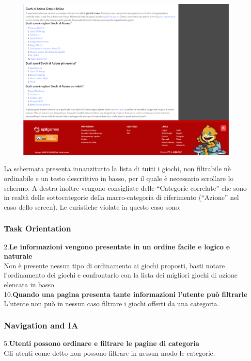 \documentclass[../Report.tex]{subfiles}
\begin{document}
    \begin{figure}[H]
        \includegraphics[width=\linewidth]{Assestment8.png}
        \centering
    \end{figure}
    La schermata presenta innanzitutto la lista di tutti i giochi, non filtrabile nè ordinabile e un testo descrittivo in basso, per il quale è necessario scrollare lo schermo. A destra inoltre vengono consigliate delle “Categorie correlate” che sono in realtà delle sottocategorie della macro-categoria di riferimento (“Azione” nel caso dello screen). Le euristiche violate in questo caso sono:

    \subsubsection{Task Orientation}
    2.\textbf{Le informazioni vengono presentate in un ordine facile e logico e naturale}\\
        Non è presente nessun tipo di ordinamento ai giochi proposti, basti notare l’ordinamento dei giochi e confrontarlo con la lista dei migliori giochi di azione elencata in basso.\\

    10.\textbf{Quando una pagina presenta tante informazioni l’utente può filtrarle} \\
        L’utente non può in nessun caso filtrare i giochi offerti da una categoria.\\
    
    \subsubsection{Navigation and IA}
    5.\textbf{Utenti possono ordinare e filtrare le pagine di categoria}\\
    Gli utenti come detto non possono filtrare in nessun modo le categorie.\\
\end{document}
